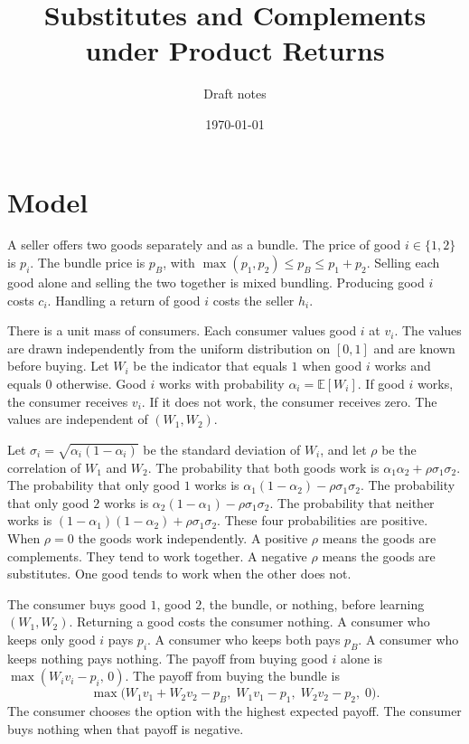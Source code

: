 \documentclass[11pt]{article}
\title{Substitutes and Complements under Product Returns}
\author{Draft notes}
\date{\today}
\begin{document}
\maketitle

\section{Model}

A seller offers two goods separately and as a bundle. The price of good
$i\in\{1,2\}$ is $p_i$. The bundle price is $p_B$, with
$\max(p_1,p_2)\le p_B\le p_1+p_2$. Selling each good alone and selling the
two together is mixed bundling. Producing good $i$ costs $c_i$. Handling a
return of good $i$ costs the seller $h_i$.

There is a unit mass of consumers. Each consumer values good $i$ at $v_i$.
The values are drawn independently from the uniform distribution on $[0,1]$
and are known before buying. Let $W_i$ be the indicator that equals $1$ when
good $i$ works and equals $0$ otherwise. Good $i$ works with probability
$\alpha_i=\mathbb{E}[W_i]$. If good $i$ works, the consumer receives $v_i$.
If it does not work, the consumer receives zero. The values are independent
of $(W_1,W_2)$.

Let $\sigma_i=\sqrt{\alpha_i(1-\alpha_i)}$ be the standard deviation of
$W_i$, and let $\rho$ be the correlation of $W_1$ and $W_2$. The probability
that both goods work is $\alpha_1\alpha_2+\rho\sigma_1\sigma_2$. The
probability that only good $1$ works is
$\alpha_1(1-\alpha_2)-\rho\sigma_1\sigma_2$. The probability that only good
$2$ works is $\alpha_2(1-\alpha_1)-\rho\sigma_1\sigma_2$. The probability
that neither works is $(1-\alpha_1)(1-\alpha_2)+\rho\sigma_1\sigma_2$. These
four probabilities are positive. When $\rho=0$ the goods work independently.
A positive $\rho$ means the goods are complements. They tend to work
together. A negative $\rho$ means the goods are substitutes. One good tends
to work when the other does not.

The consumer buys good $1$, good $2$, the bundle, or nothing, before learning
$(W_1,W_2)$. Returning a good costs the consumer nothing. A consumer who keeps
only good $i$ pays $p_i$. A consumer who keeps both pays $p_B$. A consumer
who keeps nothing pays nothing. The payoff from buying good $i$ alone is
$\max(W_i v_i-p_i,\,0)$. The payoff from buying the bundle is
\[
  \max\bigl(W_1 v_1+W_2 v_2-p_B,\;
  W_1 v_1-p_1,\;
  W_2 v_2-p_2,\;
  0\bigr).
\]
The consumer chooses the option with the highest expected payoff. The
consumer buys nothing when that payoff is negative.
\end{document}
